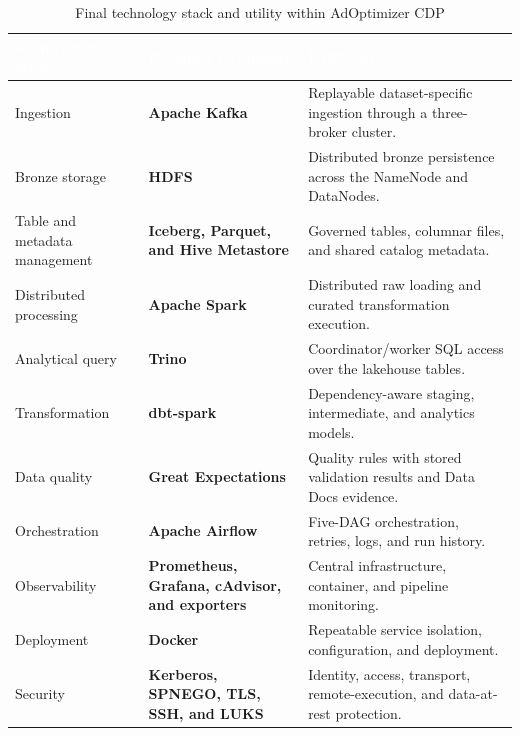 \begin{table}[htbp]
    \centering
    \footnotesize
    \setlength{\tabcolsep}{3.5pt}
    \renewcommand{\arraystretch}{1.00}
    \begin{tabularx}{\textwidth}{|L{0.19\textwidth}|L{0.29\textwidth}|Y|}
        \hline
        \textcolor{white}{\textbf{Architectural layer}} & \textcolor{white}{\textbf{Retained technology}} & \textcolor{white}{\textbf{Utility in \projectname{}}} \\
        \hline
        Ingestion & \textbf{Apache Kafka} & Replayable dataset-specific ingestion through a three-broker cluster. \\
        \hline
        Bronze storage & \textbf{HDFS} & Distributed bronze persistence across the NameNode and DataNodes. \\
        \hline
        Table and metadata management & \textbf{Iceberg, Parquet, and Hive Metastore} & Governed tables, columnar files, and shared catalog metadata. \\
        \hline
        Distributed processing & \textbf{Apache Spark} & Distributed raw loading and curated transformation execution. \\
        \hline
        Analytical query & \textbf{Trino} & Coordinator/worker SQL access over the lakehouse tables. \\
        \hline
        Transformation & \textbf{dbt-spark} & Dependency-aware staging, intermediate, and analytics models. \\
        \hline
        Data quality & \textbf{Great Expectations} & Quality rules with stored validation results and Data Docs evidence. \\
        \hline
        Orchestration & \textbf{Apache Airflow} & Five-DAG orchestration, retries, logs, and run history. \\
        \hline
        Observability & \textbf{Prometheus, Grafana, cAdvisor, and exporters} & Central infrastructure, container, and pipeline monitoring. \\
        \hline
        Deployment & \textbf{Docker} & Repeatable service isolation, configuration, and deployment. \\
        \hline
        Security & \textbf{Kerberos, SPNEGO, TLS, SSH, and LUKS} & Identity, access, transport, remote-execution, and data-at-rest protection. \\
        \hline
    \end{tabularx}
    \caption{Final technology stack and utility within AdOptimizer CDP}
    \label{tab:chapter3-final-stack}
\end{table}
\FloatBarrier

